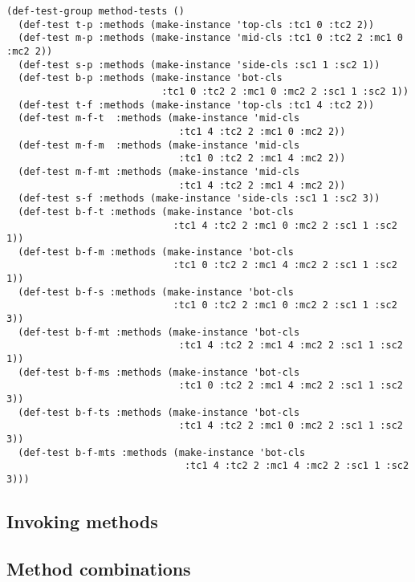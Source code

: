 \begin{verbatim}
(def-test-group method-tests ()
  (def-test t-p :methods (make-instance 'top-cls :tc1 0 :tc2 2))
  (def-test m-p :methods (make-instance 'mid-cls :tc1 0 :tc2 2 :mc1 0 :mc2 2))
  (def-test s-p :methods (make-instance 'side-cls :sc1 1 :sc2 1))
  (def-test b-p :methods (make-instance 'bot-cls
                           :tc1 0 :tc2 2 :mc1 0 :mc2 2 :sc1 1 :sc2 1))
  (def-test t-f :methods (make-instance 'top-cls :tc1 4 :tc2 2))
  (def-test m-f-t  :methods (make-instance 'mid-cls
                              :tc1 4 :tc2 2 :mc1 0 :mc2 2))
  (def-test m-f-m  :methods (make-instance 'mid-cls
                              :tc1 0 :tc2 2 :mc1 4 :mc2 2))
  (def-test m-f-mt :methods (make-instance 'mid-cls
                              :tc1 4 :tc2 2 :mc1 4 :mc2 2))
  (def-test s-f :methods (make-instance 'side-cls :sc1 1 :sc2 3))
  (def-test b-f-t :methods (make-instance 'bot-cls
                             :tc1 4 :tc2 2 :mc1 0 :mc2 2 :sc1 1 :sc2 1))
  (def-test b-f-m :methods (make-instance 'bot-cls
                             :tc1 0 :tc2 2 :mc1 4 :mc2 2 :sc1 1 :sc2 1))
  (def-test b-f-s :methods (make-instance 'bot-cls
                             :tc1 0 :tc2 2 :mc1 0 :mc2 2 :sc1 1 :sc2 3))
  (def-test b-f-mt :methods (make-instance 'bot-cls
                              :tc1 4 :tc2 2 :mc1 4 :mc2 2 :sc1 1 :sc2 1))
  (def-test b-f-ms :methods (make-instance 'bot-cls
                              :tc1 0 :tc2 2 :mc1 4 :mc2 2 :sc1 1 :sc2 3))
  (def-test b-f-ts :methods (make-instance 'bot-cls
                              :tc1 4 :tc2 2 :mc1 0 :mc2 2 :sc1 1 :sc2 3))
  (def-test b-f-mts :methods (make-instance 'bot-cls
                               :tc1 4 :tc2 2 :mc1 4 :mc2 2 :sc1 1 :sc2 3)))
\end{verbatim}

\subsection{Invoking methods}

\subsection{Method combinations}



